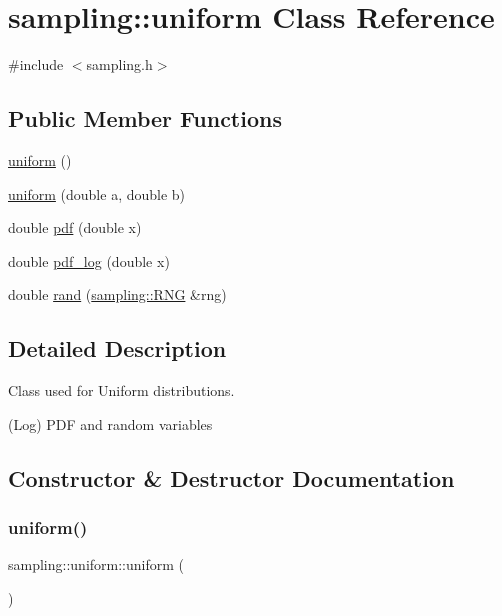\hypertarget{classsampling_1_1uniform}{}\section{sampling\+:\+:uniform Class Reference}
\label{classsampling_1_1uniform}


{\ttfamily \#include $<$sampling.\+h$>$}

\subsection*{Public Member Functions}
\begin{DoxyCompactItemize}
\item 
\hyperlink{classsampling_1_1uniform_a414a98d445c6a07bbe78ea677db19f69}{uniform} ()
\item 
\hyperlink{classsampling_1_1uniform_a67fa371e5e843209c83d584c33dd8957}{uniform} (double a, double b)
\item 
double \hyperlink{classsampling_1_1uniform_a9fcb1597ca643fb1c2184f6febc69b0d}{pdf} (double x)
\item 
double \hyperlink{classsampling_1_1uniform_a30fa2f2be90f2f9f2d46069540019fb4}{pdf\+\_\+log} (double x)
\item 
double \hyperlink{classsampling_1_1uniform_aee0b21aec2c50cdb6d926d5c3890d695}{rand} (\hyperlink{classsampling_1_1RNG}{sampling\+::\+R\+NG} \&rng)
\end{DoxyCompactItemize}


\subsection{Detailed Description}
Class used for Uniform distributions.

(Log) P\+DF and random variables 

\subsection{Constructor \& Destructor Documentation}
\mbox{\label{classsampling_1_1uniform_a414a98d445c6a07bbe78ea677db19f69}} 
\subsubsection{\texorpdfstring{uniform()}{uniform()}\hspace{0.1cm}{\footnotesize\ttfamily [1/2]}}
{\footnotesize\ttfamily sampling\+::uniform\+::uniform (\begin{DoxyParamCaption}{ }\end{DoxyParamCaption})}

